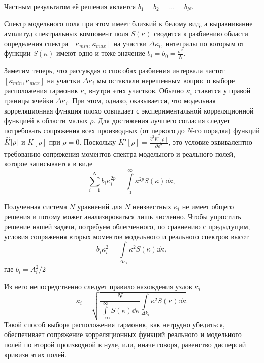 Частным результатом её решения является $b_1 = b_2 = \dots = b_N$.

Спектр модельного поля при этом имеет близкий к белому вид, а выравнивание
амплитуд спектральных компонент поля $S(\kappa)$ сводится к разбиению области
определения спектра $[\kappa_{min},\kappa_{max}]$ на участки $\Delta
\kappa_i$, интегралы по
которым от функции  $S(\kappa)$ имеют одно и тоже значение $b_i = b_{0} =
\frac{\sigma^2}{N}$.

Заметим теперь, что рассуждая о способах разбиения интервала частот
$[\kappa_{min},
\kappa_{max}]$ на участки $\Delta \kappa_i$ мы оставляли нерешенным вопрос о выборе
расположения гармоник $\kappa_i$ внутри этих участков. Обычно  $\kappa_i$ ставится у
правой границы ячейки  $\Delta \kappa_i$. При этом, однако, оказывается, что
модельная корреляционная функция плохо совпадает с экспериментальной
корреляционной функцией в области малых  $\rho$. Для достижения лучшего
согласия следует потребовать сопряжения всех производных (от первого до $N$-го
порядка) функций $\widetilde K[\rho]$ и  $K[\rho]$ при  $\rho=0$. 
Поскольку $K'[\rho] = \frac{\partial^2 K[\rho]}{\partial \rho^2}$, это условие эквивалентно
требованию сопряжения моментов спектра модельного и реального полей, которое
записывается в виде
 \begin{equation}
    \sum\limits_{i=1}^{N} b_i \kappa_i^{2p} 
    = \int\limits_{0}^{\infty} \kappa^{2p}S(\kappa) \dd \kappa, 
\end{equation}

Полученная система $N$ уравнений для $N$ неизвестных $\kappa_i$ не имеет общего
решения и потому может анализироваться лишь численно. Чтобы упростить решение
нашей задачи, потребуем облегченного, по сравнению с предыдущим, условия
сопряжения вторых моментов модельного и реального спектров высот
 \begin{equation}
    b_i \kappa_i^2 = \int\limits_{\Delta \kappa_i} \kappa^2 S(\kappa) \dd \kappa,
\end{equation}
где $b_i= A_i^2 / 2$

Из него непосредственно следует правило нахождения узлов $\kappa_i$ 
\begin{equation}
    \label{eq:ki}
    {
        \kappa_i = \sqrt{\frac{N}{\int\limits_{-\infty}^{\infty} S(\kappa) \dd
        \kappa} \int\limits_{\Delta k_i} \kappa^2
    S(\kappa) \dd \kappa}. 
    }
\end{equation}
Такой способ выбора расположения гармоник, как нетрудно убедиться, обеспечивает
сопряжение корреляционных функций реального и модельного полей по второй
производной в нуле, или, иначе говоря, равенство дисперсий кривизн этих
полей.

